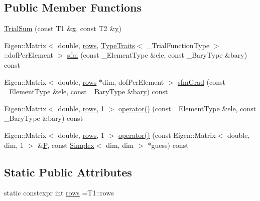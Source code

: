 \subsection*{Public Member Functions}
\begin{DoxyCompactItemize}
\item 
\hyperlink{classmodel_1_1_trial_sum_a6944d852de6b2fb7240b927122faa934}{Trial\+Sum} (const T1 \&\hyperlink{generate_s_t_lcyl_8m_a9336ebf25087d91c818ee6e9ec29f8c1}{x}, const T2 \&\hyperlink{generate_s_t_lcyl_8m_a2fb1c5cf58867b5bbc9a1b145a86f3a0}{y})
\item 
Eigen\+::\+Matrix$<$ double, \hyperlink{classmodel_1_1_trial_sum_a956aa96edbfc38a650053f77c3595f16}{rows}, \hyperlink{structmodel_1_1_type_traits}{Type\+Traits}$<$ \+\_\+\+Trial\+Function\+Type $>$\+::dof\+Per\+Element $>$ \hyperlink{classmodel_1_1_trial_sum_af1ae474d2364c427a2b1b789e38dd58f}{sfm} (const \+\_\+\+Element\+Type \&ele, const \+\_\+\+Bary\+Type \&bary) const 
\item 
Eigen\+::\+Matrix$<$ double, \hyperlink{classmodel_1_1_trial_sum_a956aa96edbfc38a650053f77c3595f16}{rows} $\ast$dim, dof\+Per\+Element $>$ \hyperlink{classmodel_1_1_trial_sum_ae06da58536455eb24dc3452eda6312bc}{sfm\+Grad} (const \+\_\+\+Element\+Type \&ele, const \+\_\+\+Bary\+Type \&bary) const 
\item 
Eigen\+::\+Matrix$<$ double, \hyperlink{classmodel_1_1_trial_sum_a956aa96edbfc38a650053f77c3595f16}{rows}, 1 $>$ \hyperlink{classmodel_1_1_trial_sum_a904c3879a06749ba8b3b854bf0bd3c67}{operator()} (const \+\_\+\+Element\+Type \&ele, const \+\_\+\+Bary\+Type \&bary) const 
\item 
Eigen\+::\+Matrix$<$ double, \hyperlink{classmodel_1_1_trial_sum_a956aa96edbfc38a650053f77c3595f16}{rows}, 1 $>$ \hyperlink{classmodel_1_1_trial_sum_aeb396b34c4f777ae85c50a763a443f08}{operator()} (const Eigen\+::\+Matrix$<$ double, dim, 1 $>$ \&\hyperlink{_f_e_m_2linear__elasticity__3d_2tetgen_2generate_p_o_l_ycube_8m_a50a9afb44201a65ab7ad5feb2150aeb6}{P}, const \hyperlink{classmodel_1_1_simplex}{Simplex}$<$ dim, dim $>$ $\ast$guess) const 
\end{DoxyCompactItemize}
\subsection*{Static Public Attributes}
\begin{DoxyCompactItemize}
\item 
static constexpr int \hyperlink{classmodel_1_1_trial_sum_a956aa96edbfc38a650053f77c3595f16}{rows} =T1\+::rows
\end{DoxyCompactItemize}
